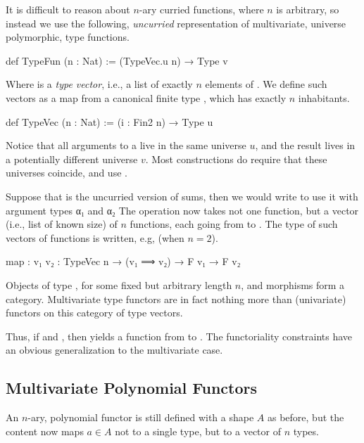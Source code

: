 It is difficult to reason about $n$-ary curried functions, where $n$ is arbitrary, so instead we use the following, \emph{uncurried} representation of multivariate, universe polymorphic, type functions.

\begin{leancode}
    def TypeFun (n : Nat) := (TypeVec.{u} n) → Type v
\end{leancode}
Where  is a \emph{type vector}, i.e., a list of exactly $n$ elements of .
We define such vectors as a map from a canonical finite type , which has exactly $n$ inhabitants.
\begin{leancode}
    def TypeVec (n : Nat) := (i : Fin2 n) → Type u
\end{leancode}
Notice that all arguments to a  live in the same universe $u$, and the result lives in a potentially different universe $v$. 
Most constructions do require that these universes coincide, and use .

Suppose that  is the uncurried version of sums, then we would write  to use it with argument types α₁ and α₂ The  operation now takes not one function, but a vector (i.e., list of known size) of $n$ functions, each going from  to . The type of such vectors of functions is written, e.g,  (when $n=2$).

\begin{leancode}
    map : {v₁ v₂ : TypeVec n} → (v₁ ⟹ v₂) → F v₁ → F v₂
\end{leancode}
\begin{remark}
    Objects of type , for some fixed but arbitrary length $n$, and morphisms  form a category. 
    Multivariate type functors are in fact nothing more than (univariate) functors on this category of type vectors.
\end{remark}

Thus, if  and , then  yields a function from  to .
The functoriality constraints have an obvious generalization to the multivariate case.

\subsection{Multivariate Polynomial Functors}
An $n$-ary, polynomial functor is still defined with a shape $A$ as before, but the content now maps $a ∈ A$ not to a single type, but to a vector of $n$ types.

